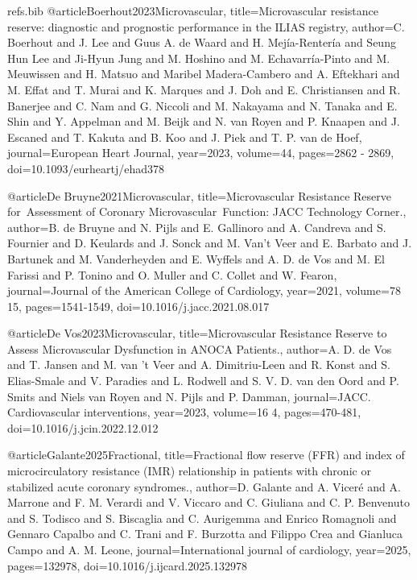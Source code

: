 \begin{filecontents}{refs.bib}
@article{Boerhout2023Microvascular,
title={Microvascular resistance reserve: diagnostic and prognostic performance in the ILIAS registry},
author={C. Boerhout and J. Lee and Guus A. de Waard and H. Mejía-Rentería and Seung Hun Lee and Ji-Hyun Jung and M. Hoshino and M. Echavarría-Pinto and M. Meuwissen and H. Matsuo and Maribel Madera-Cambero and A. Eftekhari and M. Effat and T. Murai and K. Marques and J. Doh and E. Christiansen and R. Banerjee and C. Nam and G. Niccoli and M. Nakayama and N. Tanaka and E. Shin and Y. Appelman and M. Beijk and N. van Royen and P. Knaapen and J. Escaned and T. Kakuta and B. Koo and J. Piek and T. P. van de Hoef},
journal={European Heart Journal},
year={2023},
volume={44},
pages={2862 - 2869},
doi={10.1093/eurheartj/ehad378}
}

@article{De Bruyne2021Microvascular,
title={Microvascular Resistance Reserve for Assessment of Coronary Microvascular Function: JACC Technology Corner.},
author={B. de Bruyne and N. Pijls and E. Gallinoro and A. Candreva and S. Fournier and D. Keulards and J. Sonck and M. Van't Veer and E. Barbato and J. Bartunek and M. Vanderheyden and E. Wyffels and A. D. de Vos and M. El Farissi and P. Tonino and O. Muller and C. Collet and W. Fearon},
journal={Journal of the American College of Cardiology},
year={2021},
volume={78 15},
pages={1541-1549},
doi={10.1016/j.jacc.2021.08.017}
}

@article{De Vos2023Microvascular,
title={Microvascular Resistance Reserve to Assess Microvascular Dysfunction in ANOCA Patients.},
author={A. D. de Vos and T. Jansen and M. van ’t Veer and A. Dimitriu-Leen and R. Konst and S. Elias-Smale and V. Paradies and L. Rodwell and S. V. D. van den Oord and P. Smits and Niels van Royen and N. Pijls and P. Damman},
journal={JACC. Cardiovascular interventions},
year={2023},
volume={16 4},
pages={470-481},
doi={10.1016/j.jcin.2022.12.012}
}

@article{Galante2025Fractional,
title={Fractional flow reserve (FFR) and index of microcirculatory resistance (IMR) relationship in patients with chronic or stabilized acute coronary syndromes.},
author={D. Galante and A. Viceré and A. Marrone and F. M. Verardi and V. Viccaro and C. Giuliana and C. P. Benvenuto and S. Todisco and S. Biscaglia and C. Aurigemma and Enrico Romagnoli and Gennaro Capalbo and C. Trani and F. Burzotta and Filippo Crea and Gianluca Campo and A. M. Leone},
journal={International journal of cardiology},
year={2025},
pages={132978},
doi={10.1016/j.ijcard.2025.132978}
}


\end{filecontents}
